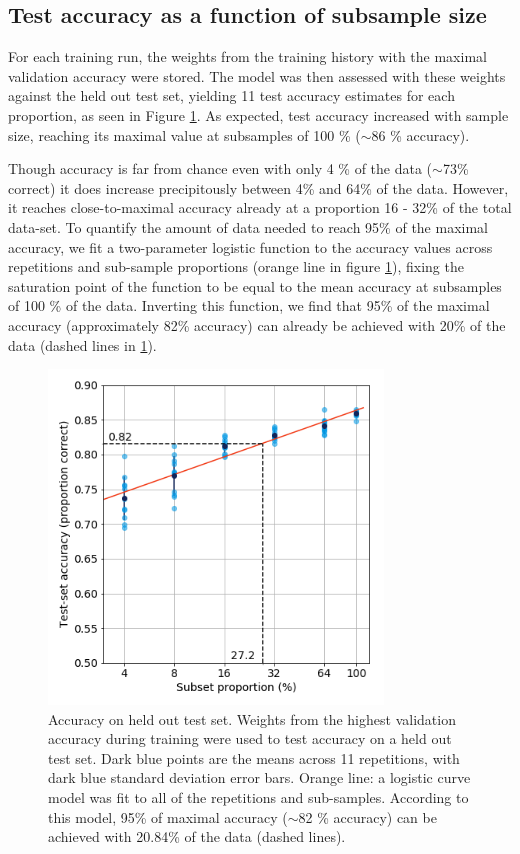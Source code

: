\subsection{Test accuracy as a function of subsample size}

For each training run, the weights from the training history with the maximal
validation accuracy were stored. The model was then assessed with these weights
against the held out test set, yielding 11 test accuracy estimates for each
proportion, as seen in Figure \ref{fig_test}. As expected, test accuracy
increased with sample size, reaching its maximal value at subsamples of 100 \%
($\sim$86 \% accuracy).

Though accuracy is far from chance even with only 4 \% of the data ($\sim$73\%
correct) it does increase precipitously between 4\% and 64\% of the data.
However, it reaches close-to-maximal accuracy already at a proportion 16 - 32\%
of the total data-set. To quantify the amount of data needed to reach 95\% of
the maximal accuracy, we fit a two-parameter logistic function to the accuracy
values across repetitions and sub-sample proportions (orange line in figure
\ref{fig_test}), fixing the saturation point of the function to be equal
to the mean accuracy at subsamples of 100 \% of the data. Inverting this
function, we find that 95\% of the maximal accuracy (approximately 82\%
accuracy) can already be achieved with 20\% of the data (dashed lines in
\ref{fig_test}).

\begin{figure}[!t]
\centering
\includegraphics[width=3.5in]{./figures/test}

\caption{Accuracy on held out test set. Weights from the highest validation
accuracy during training were used to test accuracy on a held out test set. Dark
blue points are the means across 11 repetitions, with dark blue standard
deviation error bars. Orange line: a logistic curve model was fit to all of the
repetitions and sub-samples. According to this model, 95\% of maximal accuracy
($\sim$82 \% accuracy) can be achieved with 20.84\% of the data (dashed lines).}

\label{fig_test}
\end{figure}

